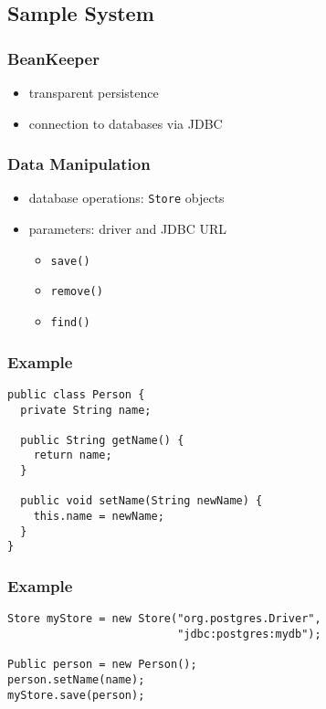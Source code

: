 \documentclass[dvipsnames]{beamer}
\theoremstyle{plain}
\begin{document}
\subsection{Sample System}

\begin{frame}
  \frametitle{BeanKeeper}

  \begin{itemize}
    \item transparent persistence
    \item connection to databases via JDBC
  \end{itemize}
\end{frame}

\begin{frame}
  \frametitle{Data Manipulation}

  \begin{itemize}
    \item database operations: \lstinline!Store! objects
    \item parameters: driver and JDBC URL
    \begin{itemize}
      \item \lstinline!save()!
      \item \lstinline!remove()!
      \item \lstinline!find()!
    \end{itemize}
  \end{itemize}
\end{frame}

\begin{frame}[fragile]
  \frametitle{Example}

  \begin{example}
    \begin{lstlisting}
public class Person {
  private String name;

  public String getName() {
    return name;
  }

  public void setName(String newName) {
    this.name = newName;
  }
}
    \end{lstlisting}
  \end{example}
\end{frame}

\begin{frame}[fragile]
  \frametitle{Example}

  \begin{example}
    \begin{lstlisting}
Store myStore = new Store("org.postgres.Driver",
                          "jdbc:postgres:mydb");

Public person = new Person();
person.setName(name);
myStore.save(person);
    \end{lstlisting}
  \end{example}
\end{frame}
\end{document}
